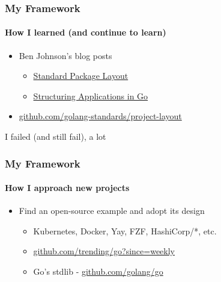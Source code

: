 
\begin{frame}
  \frametitle{My Framework}
  \framesubtitle{How I learned (and continue to learn)}

  \begin{itemize}
    \item Ben Johnson's blog posts
    \begin{itemize}
      \item \href{https://medium.com/@benbjohnson/standard-package-layout-7cdbc8391fc1}{Standard Package Layout}
      \item \href{https://medium.com/@benbjohnson/structuring-applications-in-go-3b04be4ff091}{Structuring Applications in Go}
    \end{itemize}
  \item \url{github.com/golang-standards/project-layout}
  \end{itemize}

  \pause
  \vspace{1em}
  \centering
  I failed (and still fail), a lot
\end{frame}

\begin{frame}
  \frametitle{My Framework}
  \framesubtitle{How I approach new projects}

  \begin{itemize}
    \item Find an open-source example and adopt its design
    \begin{itemize}
      \item Kubernetes, Docker, Yay, FZF, HashiCorp/*, etc.
      \item \url{github.com/trending/go?since=weekly}
      \item Go's stdlib - \url{github.com/golang/go}
    \end{itemize}
  \end{itemize}

\end{frame}
